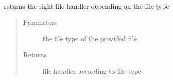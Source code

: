 \documentclass[letterpaper,10pt,english]{sphinxmanual}
\begin{document}
\begin{fulllineitems}
\label{\detokenize{eventLogConverter:eventLogConverter.defaultFileHandlersFactory.FileCreatorFactory}}~

\begin{fulllineitems}
\label{\detokenize{eventLogConverter:eventLogConverter.defaultFileHandlersFactory.FileCreatorFactory.create}}
returns the right file handler depending on the file type
\begin{quote}\begin{description}
\item[{Parameters}] \leavevmode
{} \textendash{} the file type of the provided file

\item[{Returns}] \leavevmode
file handler according to file type

\end{description}\end{quote}

\end{fulllineitems}


\end{fulllineitems}

\end{document}
